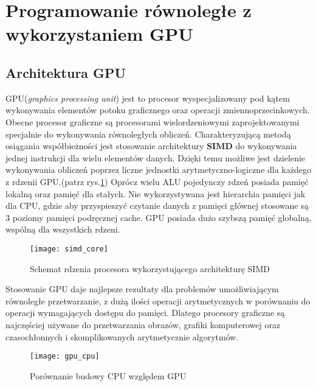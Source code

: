 \documentclass[document.tex]{subfiles}
\begin{document}

\clearpage


\section{Programowanie równoległe z wykorzystaniem GPU}

\subsection{Architektura GPU}

\indent GPU(\textit{graphics processing unit}) jest to  
procesor wyspecjalizowany pod kątem wykonywania elementów potoku
graficznego oraz operacji zmiennoprzecinkowych. Obecne procesor graficzne
są procesorami wielordzeniowymi zaprojektowanymi specjalnie do wykonywania 
równoległych obliczeń. Charakteryzującą metodą osiągania współbieżności jest stosowanie architektury \textbf{SIMD} do wykonywania jednej instrukcji dla wielu elementów danych. Dzięki temu możliwe jest dzielenie wykonywania obliczeń poprzez liczne jednostki arytmetyczno-logiczne dla każdego z rdzenii GPU.(patrz rys.\ref{fig:simd_core})\cite{OpenCL_Gaster}\cite{Computer_Architecture_Patterson_Hennesy}
Oprócz wielu ALU pojedynczy rdzeń posiada pamięć lokalną
oraz pamięć dla stałych. Nie wykorzystywana jest hierarchia pamięci jak dla CPU, gdzie aby przyspieszyć 
czytanie danych z pamięci głównej stosowane są 3 poziomy pamięci podręcznej cache. GPU posiada dużo szybszą pamięć globalną, wspólną dla wszystkich rdzeni.

\begin{figure}[h]
\texttt{[image: simd\_core]}
\caption{Schemat rdzenia procesora wykorzystującego architekturę SIMD \protect\cite{Intro_GPU}}
\label{fig:simd_core}
\end{figure}

\indent Stosowanie GPU daje najlepsze rezultaty dla problemów umożliwiającym równoległe przetwarzanie, z dużą ilości operacji arytmetycznych w porównaniu do operacji wymagających dostępu do pamięci.
Dlatego procesory graficzne są najczęściej używane do przetwarzania obrazów, grafiki komputerowej oraz 
czasochłonnych i skomplikowanych arytmetycznie algorytmów.\cite{GPU_Owens}\cite{OpenCL_Gaster}
\begin{figure}[h]
\texttt{[image: gpu\_cpu]}
\caption{Porównanie budowy CPU względem GPU\protect\cite{OS_Stallings}}
\label{fig:gpu_cpu}
\end{figure}
\end{document}
